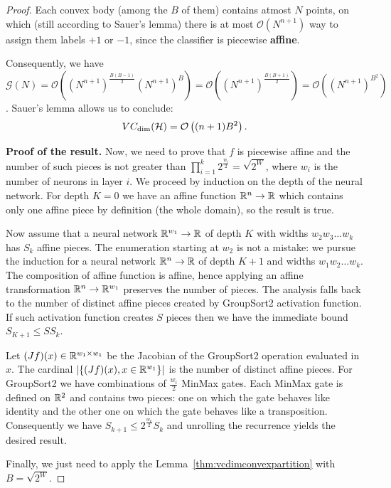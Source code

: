 \begin{proof}
                Each convex body (among the $B$ of them) contains atmost $N$ points, on which (still according to Sauer's lemma) there is at most $\mathcal{O}(N^{n+1})$ way to assign them labels $+1$ or $-1$, since the classifier is piecewise \textbf{affine}.    
                  
                Consequently, we have $\mathcal{G}(N)=\mathcal{O}((N^{n+1})^{\frac{B(B-1)}{2}}(N^{n+1})^B)=\mathcal{O}((N^{n+1})^{\frac{B(B+1)}{2}})=\mathcal{O}((N^{n+1})^{B^2})$. Sauer's lemma allows us to conclude:
                $$VC_{\text{dim}}(\mathcal{H})=\mathcal{O}\left((n+1)B^2\right).$$
                
            
                \textbf{Proof of the result.} Now, we need to prove that $f$ is piecewise affine and the number of such pieces is not greater than $\prod_{i=1}^k2^{\frac{w_i}{2}}=\sqrt{2^W}$, where $w_i$ is the number of neurons in layer $i$. We proceed by induction on the depth of the neural network. For depth $K=0$ we have an affine function $\mathbb{R}^n\rightarrow\mathbb{R}$ which contains only one affine piece by definition (the whole domain), so the result is true.  
                  
                Now assume that a neural network $\mathbb{R}^{w_1}\rightarrow\mathbb{R}$ of depth $K$ with widths $w_2w_3\dots w_k$ has $S_k$ affine pieces. The enumeration starting at $w_2$ is not a mistake: we pursue the induction for a neural network $\mathbb{R}^n\rightarrow\mathbb{R}$ of depth $K+1$ and widths $w_1w_2\dots w_k$. The composition of affine function is affine, hence applying an affine transformation $\mathbb{R}
                ^n\rightarrow\mathbb{R}^{w_1}$ preserves the number of pieces. The analysis falls back to the number of distinct affine pieces created by GroupSort2 activation function. If such activation function creates $S$ pieces then we have the immediate bound $S_{K+1}\leq SS_k$.  
                  
                Let $(Jf)(x)\in\mathbb{R}^{w_1\times w_1}$ be the Jacobian of the GroupSort2 operation evaluated in $x$. The cardinal $|\{(Jf)(x),x\in\mathbb{R}^{w_1}\}|$ is the number of distinct affine pieces. For GroupSort2 we have combinations of $\frac{w_i}{2}$ MinMax gates. Each MinMax gate is defined on $\mathbb{R}^2$ and contains two pieces: one on which the gate behaves like identity and the other one on which the gate behaves like a transposition. Consequently we have $S_{k+1}\leq 2^{\frac{w_k}{2}}S_k$ and unrolling the recurrence yields the desired result.  
                  
                Finally, we just need to apply the Lemma~\ref{thm:vcdimconvexpartition} with $B=\sqrt{2^W}$.  
                
                
            \end{proof}  
            
